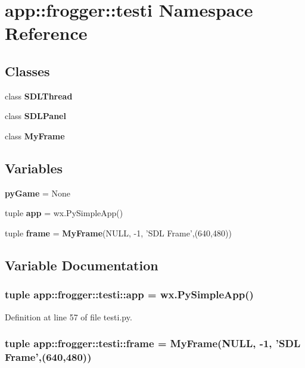 \section{app::frogger::testi Namespace Reference}
\label{namespaceapp_1_1frogger_1_1testi}


\subsection*{Classes}
\begin{CompactItemize}
\item 
class {\bf SDLThread}
\item 
class {\bf SDLPanel}
\item 
class {\bf MyFrame}
\end{CompactItemize}
\subsection*{Variables}
\begin{CompactItemize}
\item 
{\bf pyGame} = None
\item 
tuple {\bf app} = wx.PySimpleApp()
\item 
tuple {\bf frame} = {\bf MyFrame}(NULL, -1, 'SDL Frame',(640,480))
\end{CompactItemize}


\subsection{Variable Documentation}
\subsubsection{\setlength{\rightskip}{0pt plus 5cm}tuple {\bf app::frogger::testi::app} = wx.PySimpleApp()\hspace{0.3cm}{\tt  [static]}}\label{namespaceapp_1_1frogger_1_1testi_2e28ded39fbe91f02698ca9127449542}




Definition at line 57 of file testi.py.
\subsubsection{\setlength{\rightskip}{0pt plus 5cm}tuple {\bf app::frogger::testi::frame} = {\bf MyFrame}(NULL, -1, 'SDL Frame',(640,480))\hspace{0.3cm}{\tt  [static]}}\label{namespaceapp_1_1frogger_1_1testi_971fc549aa1a9f71428beca1edac61b5}




